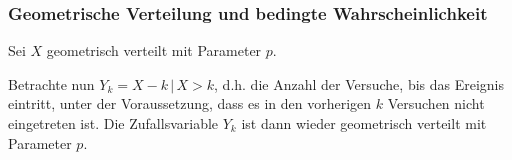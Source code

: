 \documentclass[a4paper, 11pt, accentcolor = tud3b]{tudreport}
\begin{document}
				\subsubsection{Geometrische Verteilung und bedingte Wahrscheinlichkeit}
					Sei \( X \) geometrisch verteilt mit Parameter \(p\).
				
					Betrachte nun \( Y_k = X - k \,\vert\, X > k \), d.h. die Anzahl der Versuche, bis das Ereignis eintritt, unter der Voraussetzung, dass es in den vorherigen \(k\) Versuchen nicht eingetreten ist. Die Zufallsvariable \(Y_k\) ist dann wieder geometrisch verteilt mit Parameter \(p\).
\end{document}
